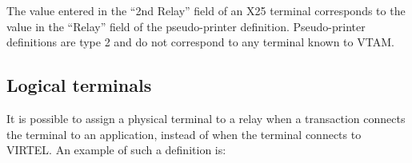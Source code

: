 \documentclass[letterpaper,10pt,english]{sphinxmanual}
\begin{document}
The value entered in the “2nd Relay” field of an X25 terminal corresponds to the value in the “Relay” field of the pseudo-printer definition. Pseudo-printer definitions are type 2 and do not correspond to any terminal known to VTAM.

\ignorespaces 

\subsection{Logical terminals}
\label{\detokenize{connectivity_guide:logical-terminals}}\label{\detokenize{connectivity_guide:index-148}}
It is possible to assign a physical terminal to a relay when a transaction connects the terminal to an application, instead of when the terminal connects to VIRTEL. An example of such a definition is:

\begin{sphinxVerbatim}[commandchars=\\\{\}]
  

                 

                     
\end{sphinxVerbatim}

\begin{sphinxVerbatim}[commandchars=\\\{\}]
      

                 

                 
                 
                 
\end{sphinxVerbatim}
\end{document}
